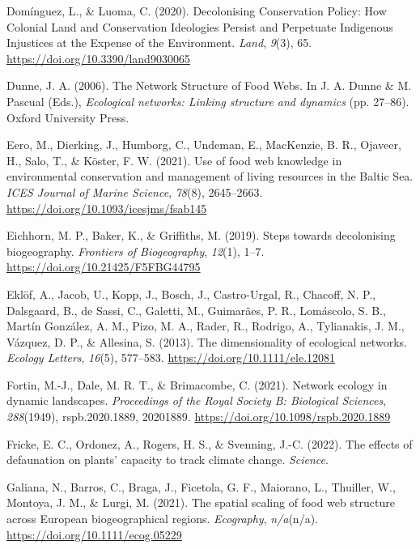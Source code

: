 \documentclass[10pt,oneside]{article}
\newlength{\cslhangindent}
\newenvironment{CSLReferences}[2] %
 {%
  \setlength{\parindent}{0pt}
  \ifodd #1 \everypar{\setlength{\hangindent}{\cslhangindent}}\ignorespaces\fi
  \ifnum #2 > 0
  \setlength{\parskip}{#2\baselineskip}
  \fi
 }%
 {}
\begin{document}
\begin{CSLReferences}{1}{0}
\leavevmode{}%
Domínguez, L., \& Luoma, C. (2020). Decolonising Conservation Policy:
How Colonial Land and Conservation Ideologies Persist and Perpetuate
Indigenous Injustices at the Expense of the Environment. \emph{Land},
\emph{9}(3), 65. \url{https://doi.org/10.3390/land9030065}

\leavevmode{}%
Dunne, J. A. (2006). The Network Structure of Food Webs. In J. A. Dunne
\& M. Pascual (Eds.), \emph{Ecological networks: Linking structure and
dynamics} (pp. 27--86). Oxford University Press.

\leavevmode{}%
Eero, M., Dierking, J., Humborg, C., Undeman, E., MacKenzie, B. R.,
Ojaveer, H., Salo, T., \& Köster, F. W. (2021). Use of food web
knowledge in environmental conservation and management of living
resources in the Baltic Sea. \emph{ICES Journal of Marine Science},
\emph{78}(8), 2645--2663. \url{https://doi.org/10.1093/icesjms/fsab145}

\leavevmode{}%
Eichhorn, M. P., Baker, K., \& Griffiths, M. (2019). Steps towards
decolonising biogeography. \emph{Frontiers of Biogeography},
\emph{12}(1), 1--7. \url{https://doi.org/10.21425/F5FBG44795}

\leavevmode{}%
Eklöf, A., Jacob, U., Kopp, J., Bosch, J., Castro-Urgal, R., Chacoff, N.
P., Dalsgaard, B., de Sassi, C., Galetti, M., Guimarães, P. R.,
Lomáscolo, S. B., Martín González, A. M., Pizo, M. A., Rader, R.,
Rodrigo, A., Tylianakis, J. M., Vázquez, D. P., \& Allesina, S. (2013).
The dimensionality of ecological networks. \emph{Ecology Letters},
\emph{16}(5), 577--583. \url{https://doi.org/10.1111/ele.12081}

\leavevmode{}%
Fortin, M.-J., Dale, M. R. T., \& Brimacombe, C. (2021). Network ecology
in dynamic landscapes. \emph{Proceedings of the Royal Society B:
Biological Sciences}, \emph{288}(1949), rspb.2020.1889, 20201889.
\url{https://doi.org/10.1098/rspb.2020.1889}

\leavevmode{}%
Fricke, E. C., Ordonez, A., Rogers, H. S., \& Svenning, J.-C. (2022).
The effects of defaunation on plants' capacity to track climate change.
\emph{Science}.

\leavevmode{}%
Galiana, N., Barros, C., Braga, J., Ficetola, G. F., Maiorano, L.,
Thuiller, W., Montoya, J. M., \& Lurgi, M. (2021). The spatial scaling
of food web structure across European biogeographical regions.
\emph{Ecography}, \emph{n/a}(n/a).
\url{https://doi.org/10.1111/ecog.05229}


\end{CSLReferences}
\end{document}
